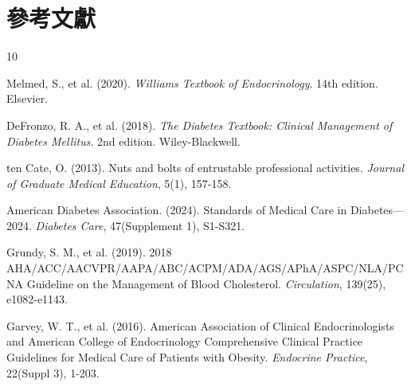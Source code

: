 \documentclass[12pt,a4paper]{article}
\begin{document}
\section{參考文獻}
\begin{thebibliography}{10}

Melmed, S., et al. (2020). \textit{Williams Textbook of Endocrinology}. 14th edition. Elsevier.

DeFronzo, R. A., et al. (2018). \textit{The Diabetes Textbook: Clinical Management of Diabetes Mellitus}. 2nd edition. Wiley-Blackwell.

ten Cate, O. (2013). Nuts and bolts of entrustable professional activities. \textit{Journal of Graduate Medical Education}, 5(1), 157-158.

American Diabetes Association. (2024). Standards of Medical Care in Diabetes—2024. \textit{Diabetes Care}, 47(Supplement 1), S1-S321.

Grundy, S. M., et al. (2019). 2018 AHA/ACC/AACVPR/AAPA/ABC/ACPM/ADA/AGS/APhA/ASPC/NLA/PCNA Guideline on the Management of Blood Cholesterol. \textit{Circulation}, 139(25), e1082-e1143.

Garvey, W. T., et al. (2016). American Association of Clinical Endocrinologists and American College of Endocrinology Comprehensive Clinical Practice Guidelines for Medical Care of Patients with Obesity. \textit{Endocrine Practice}, 22(Suppl 3), 1-203.

\end{thebibliography}
\end{document}
